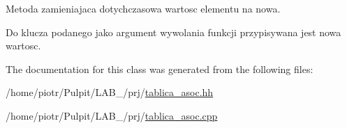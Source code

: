 \-Metoda zamieniajaca dotychczasowa wartosc elementu na nowa. 

\-Do klucza podanego jako argument wywolania funkcji przypisywana jest nowa wartosc. 

\-The documentation for this class was generated from the following files\-:\begin{DoxyCompactItemize}
\item 
/home/piotr/\-Pulpit/\-L\-A\-B\-\_/prj/\hyperlink{tablica__asoc_8hh}{tablica\-\_\-asoc.\-hh}\item 
/home/piotr/\-Pulpit/\-L\-A\-B\-\_/prj/\hyperlink{tablica__asoc_8cpp}{tablica\-\_\-asoc.\-cpp}\end{DoxyCompactItemize}
